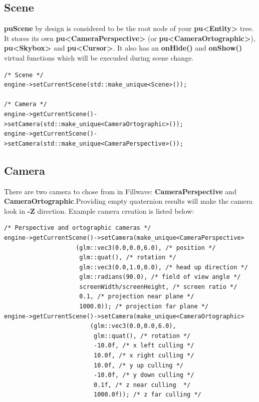 \documentclass{article}
\begin{document}
\subsection{Scene}\label{sec:Scene}
\indent \indent \textbf{puScene} by design is considered to be the root node of your \textbf{pu<Entity>} tree. It stores its own \textbf{pu<CameraPerspective>} (or \textbf{pu<CameraOrtographic>}), \textbf{pu<Skybox>} and \textbf{pu<Cursor>}. It also has an \textbf{onHide()} and \textbf{onShow()} virtual functions which will be execuded during scene change.

\begin{lstlisting}
/* Scene */
engine->setCurrentScene(std::make_unique<Scene>());

/* Camera */
engine->getCurrentScene()->setCamera(std::make_unique<CameraOrtographic>());
engine->getCurrentScene()->setCamera(std::make_unique<CameraPerspective>());
\end{lstlisting}

\subsection{Camera}\label{sec:Camera}

\indent \indent There are two camera to chose from in Fillwave: \textbf{CameraPerspective} and \textbf{CameraOrtographic}.Providing empty quaternion results will make the camera look in \textbf{-Z} direction. Example camera creation is listed below:

\begin{lstlisting}
/* Perspective and ortographic cameras */
engine->getCurrentScene()->setCamera(make_unique<CameraPerspective>
                    (glm::vec3(0.0,0.0,6.0), /* position */
                     glm::quat(), /* rotation */                
                     glm::vec3(0.0,1.0,0.0), /* head up direction */         
                     glm::radians(90.0), /* field of view angle */        
                     screenWidth/screenHeight, /* screen ratio */
                     0.1, /* projection near plane */
                     1000.0)); /* projection far plane */
engine->getCurrentScene()->setCamera(make_unique<CameraOrtographic>
                        (glm::vec3(0.0,0.0,6.0),
                         glm::quat(), /* rotation */                
                         -10.0f, /* x left culling */
                         10.0f, /* x right culling */
                         10.0f, /* y up culling */
                         -10.0f, /* y down culling */
                         0.1f, /* z near culling  */
                         1000.0f)); /* z far culling */
\end{lstlisting}
\end{document}
